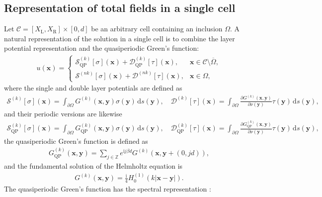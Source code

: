 \documentclass[11pt,fleqn]{article}
\newcommand{\ii}{\mathrm{i}}
\newcommand{\dd}{\mathrm{d}}
\theoremstyle{definition}
\theoremstyle{remark}
\begin{document}
\subsection{Representation of total fields in a single cell}
Let $\mathcal C=[X_\mathrm{L},X_\mathrm{R}]\times[0,d]$ be an arbitrary cell
containing an inclusion $\Omega$.
A natural representation of the solution in a single cell is to combine the layer potential representation and the quasiperiodic Green's function: \begin{align*}
  u(\mathbf{x}) = \begin{cases}
    \mathcal{S}^{(k)}_{\mathrm{QP}}[\sigma](\mathbf{x}) + \mathcal{D}^{(k)}_{\mathrm{QP}}[\tau](\mathbf{x}), & \mathbf{x} \in \mathcal{C}\setminus \overline{\Omega},\\
    \mathcal{S}^{(nk)}[\sigma](\mathbf{x}) + \mathcal{D}^{(nk)}[\tau](\mathbf{x}), & \mathbf{x} \in \Omega,
  \end{cases}
\end{align*}
where the single and double layer potentials are defined as \begin{align*}
  \mathcal{S}^{(k)}[\sigma](\mathbf{x}) = \int_{\partial \Omega} G^{(k)}(\mathbf{x},\mathbf{y}) \sigma(\mathbf{y})\, \dd s(\mathbf{y}),\quad
  \mathcal{D}^{(k)}[\tau](\mathbf{x}) = \int_{\partial \Omega} \frac{\partial G^{(k)}(\mathbf{x},\mathbf{y})}{\partial \nu(\mathbf{y})} \tau(\mathbf{y})\, \dd s(\mathbf{y}),
\end{align*}
and their periodic versions are likewise \begin{align*}
  \mathcal{S}^{(k)}_{\mathrm{QP}}[\sigma](\mathbf{x}) = \int_{\partial \Omega} G^{(k)}_{\mathrm{QP}}(\mathbf{x},\mathbf{y}) \sigma(\mathbf{y})\, \dd s(\mathbf{y}),\quad
  \mathcal{D}^{(k)}_{\mathrm{QP}}[\tau](\mathbf{x}) = \int_{\partial \Omega} \frac{\partial G^{(k)}_{\mathrm{QP}}(\mathbf{x},\mathbf{y})}{\partial \nu(\mathbf{y})} \tau(\mathbf{y})\, \dd s(\mathbf{y}),
\end{align*}
the quasiperiodic Green's function is defined as \begin{align*}
  G^{(k)}_{\mathrm{QP}}(\mathbf{x},\mathbf{y}) = \sum_{j\in\mathbb{Z}} e^{\ii j \beta d} G^{(k)}(\mathbf{x},\mathbf{y} + (0,jd)),
\end{align*}
and the fundamental solution of the Helmholtz equation is \begin{align*}
  G^{(k)}(\mathbf{x},\mathbf{y}) = \frac{\ii}{4} H_0^{(1)}(k|\mathbf{x}-\mathbf{y}|).
\end{align*}
The quasiperiodic Green's function has the spectral representation \cite{Linton1998}:
\end{document}
